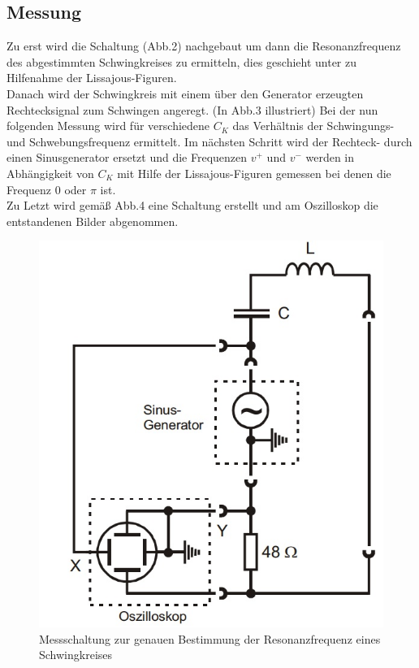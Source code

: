 \subsection{Messung}
Zu erst wird die Schaltung (Abb.2) nachgebaut um dann die Resonanzfrequenz des abgestimmten Schwingkreises zu ermitteln, dies geschieht unter zu Hilfenahme der Lissajous-Figuren. \\
Danach wird der Schwingkreis mit einem über den Generator erzeugten Rechtecksignal zum Schwingen angeregt. (In Abb.3 illustriert)
Bei der nun folgenden Messung wird für verschiedene $C_K$ das Verhältnis der Schwingungs- und Schwebungsfrequenz ermittelt.
Im nächsten Schritt wird der Rechteck- durch einen Sinusgenerator ersetzt und die Frequenzen $v^+$ und $v^-$ werden in Abhängigkeit von $C_K$ mit Hilfe der Lissajous-Figuren gemessen bei denen die Frequenz 0 oder $\pi$ ist. \\
Zu Letzt wird gemäß Abb.4 eine Schaltung erstellt und am Oszilloskop die entstandenen Bilder abgenommen. 
\begin{figure}[h]
        \centering
        \includegraphics[scale=0.5]{Grafiken/V355Abb2.jpg}
        \caption{Messschaltung zur genauen Bestimmung der Resonanzfrequenz eines Schwingkreises \cite{V355}}
        \label{fig:Abb2}
\end{figure}
